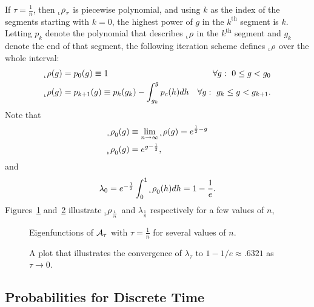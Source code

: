 \documentclass[12pt]{article} \usepackage{amsmath,amsfonts}
\newcommand{\Aop}{{\cal A}}
\newcommand{\rightfunction}{{_{_{\scalebox{.4}{R}}} \rho}}
\newcommand{\leftfunction}{{_{_{\scalebox{.4}{L}}} \rho}}
\renewcommand{\th}{^{\text{th}}}
\begin{document}
If $\tau = \frac{1}{n}$, then $\leftfunction_\tau$ is piecewise
polynomial, and using $k$ as the index of the segments starting with
$k=0$, the highest power of $g$ in the $k\th$ segment is $k$.  Letting
$p_k$ denote the polynomial that describes $\leftfunction$ in the
$k\th$ segment and $g_k$ denote the end of that segment, the following
iteration scheme defines $\leftfunction$ over the whole interval:
\begin{align*}
  \leftfunction(g) &= p_0(g) \equiv 1 &\forall g:~ 0\leq g < g_0 \\
  \leftfunction(g) &= p_{k+1}(g) \equiv p_k(g_k) - \int_{g_k}^g p_c(h) dh
                                 &\forall g:~ g_k \leq g < g_{k+1}.
\end{align*}
Note that
\begin{subequations}
  \label{eq:limit_function}
  \begin{align}
    \leftfunction_0(g) &\equiv \lim_{n \rightarrow \infty}
    \leftfunction(g) = e^{\frac{1}{2}-g} \\
    \rightfunction_0(g) &= e^{g-\frac{1}{2}},
  \end{align}
\end{subequations}
and
\begin{equation}
  \label{eq:limit_value}
  \lambda_0 =  e^{-\frac{1}{2}} \int_0^1\leftfunction_0(h) dh = 1 -
  \frac{1}{e}.
\end{equation}
Figures~\ref{fig:eigenfunctions} and~\ref{fig:eigenvalues} illustrate
$\leftfunction_{\frac{1}{n}}$ and $\lambda_{\frac{1}{n}}$ respectively
for a few values of $n$,

\begin{figure*}
  \centering
  \caption{Eigenfunctions of $\Aop_\tau$ with $\tau=\frac{1}{n}$ for
    several values of $n$.}
  \label{fig:eigenfunctions}
\end{figure*}

\begin{figure*}
  \centering
  \caption{A plot that illustrates the convergence of $\lambda_{\tau}$
    to $1-1/e\approx.6321$ as $\tau \rightarrow 0$.}
  \label{fig:eigenvalues}
\end{figure*}

\subsection{Probabilities for Discrete Time}
\label{sec:discrete_t}
\end{document}
